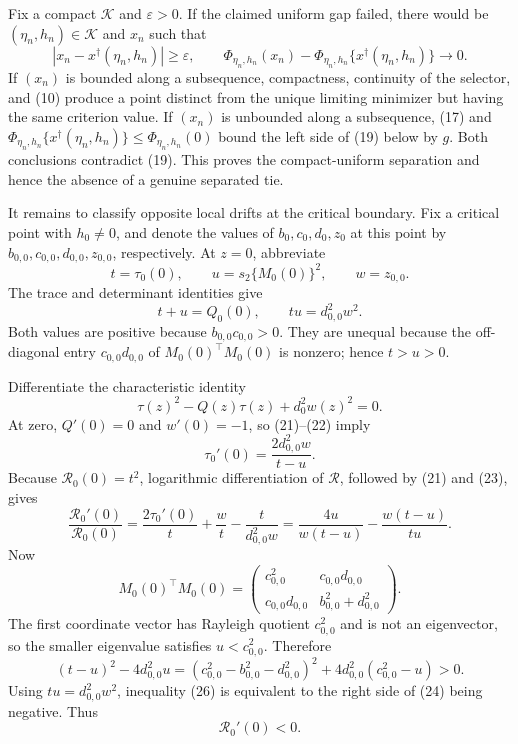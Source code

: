 Fix a compact \(\mathcal K\) and \(\varepsilon>0\).  If the claimed uniform gap failed, there would be
\((\eta_n,h_n)\in\mathcal K\) and \(x_n\) such that
\[
|x_n-x^\dagger(\eta_n,h_n)|\geq\varepsilon,
\qquad
\Phi_{\eta_n,h_n}(x_n)-
\Phi_{\eta_n,h_n}\{x^\dagger(\eta_n,h_n)\}
\longrightarrow0. \tag{19}
\]
If \((x_n)\) is bounded along a subsequence, compactness, continuity of the selector, and (10) produce a point distinct from the unique limiting minimizer but having the same criterion value.  If \((x_n)\) is unbounded along a subsequence, (17) and
\(\Phi_{\eta_n,h_n}\{x^\dagger(\eta_n,h_n)\}\leq
\Phi_{\eta_n,h_n}(0)\) bound the left side of (19) below by \(g\).  Both conclusions contradict (19).  This proves the compact-uniform separation and hence the absence of a genuine separated tie.

It remains to classify opposite local drifts at the critical boundary.  Fix a critical point with \(h_0\neq0\), and denote the values of \(b_0,c_0,d_0,z_0\) at this point by \(b_{0,0},c_{0,0},d_{0,0},z_{0,0}\), respectively.  At \(z=0\), abbreviate
\[
t=\tau_0(0),\qquad
u=s_2\{M_0(0)\}^2,\qquad
w=z_{0,0}. \tag{20}
\]
The trace and determinant identities give
\[
t+u=Q_0(0),
\qquad
tu=d_{0,0}^2w^2. \tag{21}
\]
Both values are positive because \(b_{0,0}c_{0,0}>0\).  They are unequal because the off-diagonal entry \(c_{0,0}d_{0,0}\) of
\(M_0(0)^{\top}M_0(0)\) is nonzero; hence \(t>u>0\).

Differentiate the characteristic identity
\[
\tau(z)^2-Q(z)\tau(z)+d_0^2w(z)^2=0. \tag{22}
\]
At zero, \(Q'(0)=0\) and \(w'(0)=-1\), so (21)--(22) imply
\[
\tau_0'(0)=\frac{2d_{0,0}^2w}{t-u}. \tag{23}
\]
Because \(\mathcal R_0(0)=t^2\), logarithmic differentiation of \(\mathcal R\), followed by (21) and (23), gives
\[
\frac{\mathcal R_0'(0)}{\mathcal R_0(0)}
=\frac{2\tau_0'(0)}t+\frac wt-
\frac{t}{d_{0,0}^2w}
=\frac{4u}{w(t-u)}-
\frac{w(t-u)}{tu}. \tag{24}
\]
Now
\[
M_0(0)^{\top}M_0(0)=
\begin{pmatrix}
c_{0,0}^2&c_{0,0}d_{0,0}\\
c_{0,0}d_{0,0}&b_{0,0}^2+d_{0,0}^2
\end{pmatrix}. \tag{25}
\]
The first coordinate vector has Rayleigh quotient \(c_{0,0}^2\) and is not an eigenvector, so the smaller eigenvalue satisfies
\(u<c_{0,0}^2\).  Therefore
\[
(t-u)^2-4d_{0,0}^2u
=(c_{0,0}^2-b_{0,0}^2-d_{0,0}^2)^2
+4d_{0,0}^2(c_{0,0}^2-u)>0. \tag{26}
\]
Using \(tu=d_{0,0}^2w^2\), inequality (26) is equivalent to the right side of (24) being negative.  Thus
\[
\mathcal R_0'(0)<0. \tag{27}
\]

